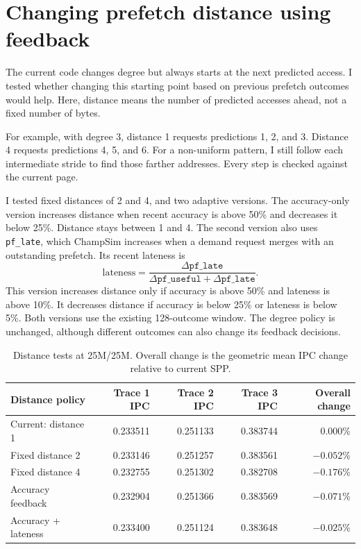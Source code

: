 \documentclass[11pt,a4paper]{article}
\begin{document}
\section{Changing prefetch distance using feedback}

The current code changes degree but always starts at the next predicted
access. I tested whether changing this starting point based on previous
prefetch outcomes would help. Here, distance means the number of
predicted accesses ahead, not a fixed number of bytes.

For example, with degree 3, distance 1 requests predictions 1, 2, and 3.
Distance 4 requests predictions 4, 5, and 6. For a non-uniform pattern,
I still follow each intermediate stride to find those farther addresses.
Every step is checked against the current page.

I tested fixed distances of 2 and 4, and two adaptive versions. The
accuracy-only version increases distance when recent accuracy is above
50\% and decreases it below 25\%. Distance stays between 1 and 4.
The second version also uses \texttt{pf\_late}, which ChampSim increases
when a demand request merges with an outstanding prefetch. Its recent
lateness is
\[
\text{lateness} =
\frac{\Delta\texttt{pf\_late}}
{\Delta\texttt{pf\_useful} + \Delta\texttt{pf\_late}}.
\]
This version increases distance only if accuracy is above 50\% and
lateness is above 10\%. It decreases distance if accuracy is below
25\% or lateness is below 5\%. Both versions use the existing 128-outcome
window. The degree policy is unchanged, although different outcomes can
also change its feedback decisions.

\begin{table}[htbp]
\centering
\small
\setlength{\tabcolsep}{4pt}
\begin{tabular}{lrrrr}
\toprule
Distance policy & Trace 1 IPC & Trace 2 IPC & Trace 3 IPC & Overall change \\
\midrule
Current: distance 1 & 0.233511 & 0.251133 & 0.383744 & 0.000\% \\
Fixed distance 2 & 0.233146 & 0.251257 & 0.383561 & $-0.052$\% \\
Fixed distance 4 & 0.232755 & 0.251302 & 0.382708 & $-0.176$\% \\
Accuracy feedback & 0.232904 & 0.251366 & 0.383569 & $-0.071$\% \\
Accuracy + lateness & 0.233400 & 0.251124 & 0.383648 & $-0.025$\% \\
\bottomrule
\end{tabular}
\caption{Distance tests at 25M/25M. Overall change is the geometric mean IPC change relative to current SPP.}
\end{table}
\end{document}
